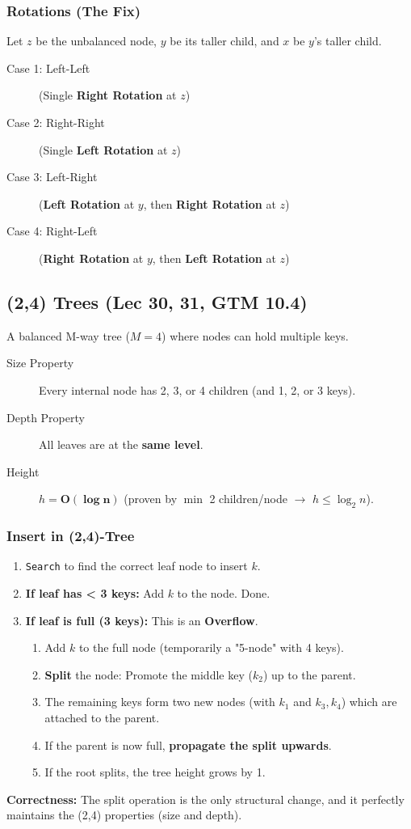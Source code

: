 \subsubsection{Rotations (The Fix)}
Let $z$ be the unbalanced node, $y$ be its taller child, and $x$ be $y$'s taller child.
\begin{description}
    \item[Case 1: Left-Left] (Single \textbf{Right Rotation} at $z$)
    \item[Case 2: Right-Right] (Single \textbf{Left Rotation} at $z$)
    \item[Case 3: Left-Right] (\textbf{Left Rotation} at $y$, then \textbf{Right Rotation} at $z$)
    \item[Case 4: Right-Left] (\textbf{Right Rotation} at $y$, then \textbf{Left Rotation} at $z$)
\end{description}

\subsection{(2,4) Trees (Lec 30, 31, GTM 10.4)}
A balanced M-way tree ($M=4$) where nodes can hold multiple keys.
\begin{description}
    \item[Size Property] Every internal node has 2, 3, or 4 children (and 1, 2, or 3 keys).
    \item[Depth Property] All leaves are at the \textbf{same level}.
    \item[Height] $h = \mathbf{O(\log n)}$ (proven by $\min$ 2 children/node $\to$ $h \le \log_2 n$).
\end{description}

\subsubsection{Insert in (2,4)-Tree}
\begin{enumerate}
    \item \texttt{Search} to find the correct leaf node to insert $k$.
    \item \textbf{If leaf has < 3 keys:} Add $k$ to the node. Done.
    \item \textbf{If leaf is full (3 keys):} This is an \textbf{Overflow}.
    \begin{enumerate}
        \item Add $k$ to the full node (temporarily a "5-node" with 4 keys).
        \item \textbf{Split} the node: Promote the middle key ($k_2$) up to the parent.
        \item The remaining keys form two new nodes (with $k_1$ and $k_3, k_4$) which are attached to the parent.
        \item If the parent is now full, \textbf{propagate the split upwards}.
        \item If the root splits, the tree height grows by 1.
    \end{enumerate}
\end{enumerate}
\textbf{Correctness:} The split operation is the only structural change, and it perfectly maintains the (2,4) properties (size and depth).

